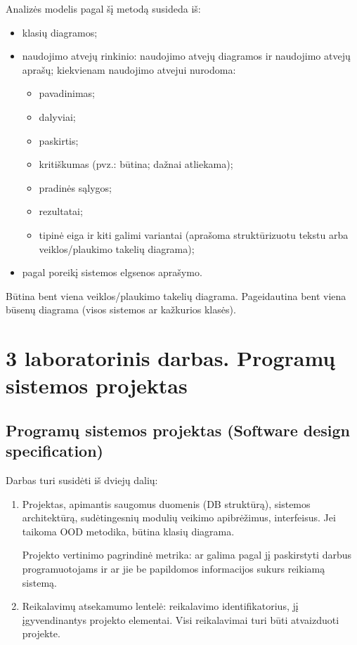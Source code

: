 \documentclass[12pt,a4paper]{article}
\begin{document}
Analizės modelis pagal šį metodą susideda iš:
\begin{itemize}
    \item klasių diagramos;
    \item naudojimo atvejų rinkinio: naudojimo atvejų diagramos ir naudojimo atvejų aprašų; kiekvienam naudojimo atvejui nurodoma:
    \begin{itemize}
        \item pavadinimas;
        \item dalyviai;
        \item paskirtis;
        \item kritiškumas (pvz.: būtina; dažnai atliekama);
        \item pradinės sąlygos;
        \item rezultatai;
        \item tipinė eiga ir kiti galimi variantai (aprašoma struktūrizuotu tekstu arba veiklos/plaukimo takelių diagrama);
    \end{itemize}
    \item pagal poreikį sistemos elgsenos aprašymo.
\end{itemize}

Būtina bent viena veiklos/plaukimo takelių diagrama. Pageidautina bent viena būsenų diagrama (visos sistemos ar kažkurios klasės).

\section*{3 laboratorinis darbas. Programų sistemos projektas}

\subsection*{Programų sistemos projektas (Software design specification)}

Darbas turi susidėti iš dviejų dalių:

\begin{enumerate}
    \item Projektas, apimantis saugomus duomenis (DB struktūrą), sistemos architektūrą, sudėtingesnių modulių veikimo apibrėžimus, interfeisus. Jei taikoma OOD metodika, būtina klasių diagrama.

    Projekto vertinimo pagrindinė metrika: ar galima pagal jį paskirstyti darbus programuotojams ir ar jie be papildomos informacijos sukurs reikiamą sistemą.

    \item Reikalavimų atsekamumo lentelė: reikalavimo identifikatorius, jį įgyvendinantys projekto elementai. Visi reikalavimai turi būti atvaizduoti projekte.
\end{enumerate}
\end{document}
